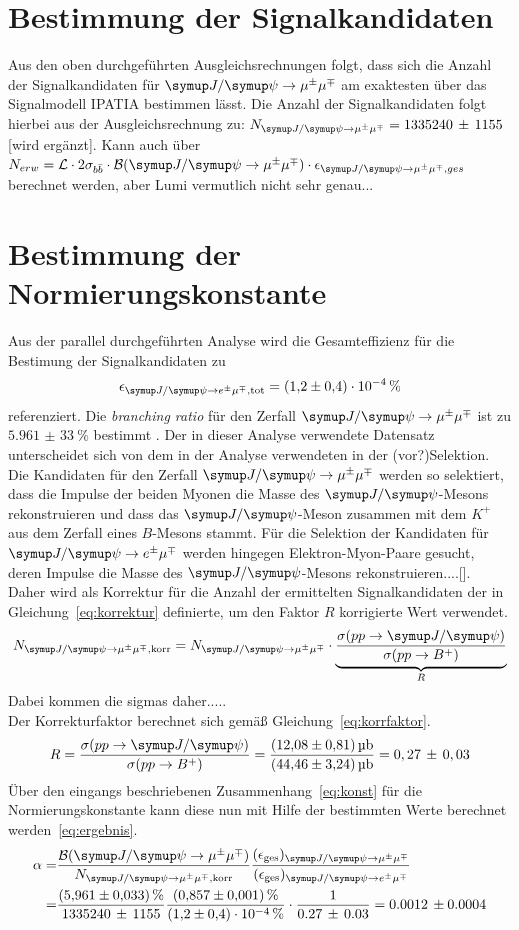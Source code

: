 \section{Bestimmung der Signalkandidaten}
%
Aus den oben durchgeführten Ausgleichsrechnungen folgt, dass sich die Anzahl der Signalkandidaten für $\kontroll$ am exaktesten über das Signalmodell \textsc{IPATIA} bestimmen lässt. Die Anzahl der Signalkandidaten folgt hierbei aus der Ausgleichsrechnung zu: $N_{\kontroll}=1335240\,\pm\,1155$ [wird ergänzt].
Kann auch über $N_{erw}=\mathcal{L}\cdot 2\sigma_{b\bar{b}}\cdot\mathcal{B}(\kontroll)\cdot\epsilon_{\kontroll, ges}$ berechnet werden, aber Lumi vermutlich nicht sehr genau...
%
\section{Bestimmung der Normierungskonstante}
%
Aus der parallel durchgeführten Analyse \cite{ba-maik} wird die Gesamteffizienz für die Bestimung der Signalkandidaten zu
%
\begin{equation}
  \epsilon_{\signal, \text{tot}}=\SI{1.2(4)e-4}{\percent}
\end{equation}
%
referenziert. Die \textit{branching ratio} für den Zerfall $\kontroll$ ist zu $\SI{5,961(33)}{\percent}$ bestimmt \cite{pdg}. Der in dieser Analyse verwendete Datensatz unterscheidet sich von dem in der Analyse \cite{ba-maik} verwendeten in der (vor?)Selektion. Die Kandidaten für den Zerfall $\kontroll$ werden so selektiert, dass die Impulse der beiden Myonen die Masse des $\jpsi$-Mesons rekonstruieren und dass das $\jpsi$-Meson zusammen mit dem $K^+$ aus dem Zerfall eines $B$-Mesons stammt. Für die Selektion der Kandidaten für $\signal$ werden hingegen Elektron-Myon-Paare gesucht, deren Impulse die Masse des $\jpsi$-Mesons rekonstruieren....[]. Daher wird als Korrektur für die Anzahl der ermittelten Signalkandidaten der in Gleichung~\eqref{eq:korrektur} definierte, um den Faktor $R$ korrigierte Wert verwendet.
%
\begin{equation}
  N_{\kontroll,\text{korr}}=N_{\kontroll}\cdot\underbrace{\frac{\sigma(pp\rightarrow\jpsi)}{\sigma(pp\rightarrow B^+)}}_{R}
  \label{eq:korrektur}
\end{equation}
%
Dabei kommen die sigmas daher.....\\ Der Korrekturfaktor berechnet sich gemäß Gleichung~\eqref{eq:korrfaktor}.
%
\begin{equation}
  R=\frac{\sigma(pp\rightarrow\jpsi)}{\sigma(pp\rightarrow B^+)}=\frac{\SI{12.08(81)}{\micro\barn}}{\SI{44.46(324)}{\micro\barn}}=0,27\,\pm\,0,03
  \label{eq:korrfaktor}
\end{equation}
Über den eingangs beschriebenen Zusammenhang~\eqref{eq:konst} für die Normierungskonstante kann diese nun mit Hilfe der bestimmten Werte berechnet werden~\eqref{eq:ergebnis}.
%
\begin{align*}
  \alpha=&\frac{\mathcal{B}(\kontroll)}{N_{\kontroll,\text{korr}}}\frac{(\epsilon_{\text{ges}})_{\kontroll}}{(\epsilon_{\text{ges}})_{\signal}} \\
  =&\frac{\SI{5,961(33)}{\percent}}{1335240\,\pm\,1155}\frac{\SI{0.857(1)}{\percent}}{\SI{1.2(4)e-4}{\percent}}\cdot\frac{1}{0.27\,\pm\,0.03}=0.0012\,\pm0.0004
  \label{eq:ergebnis}
\end{align*}
%
